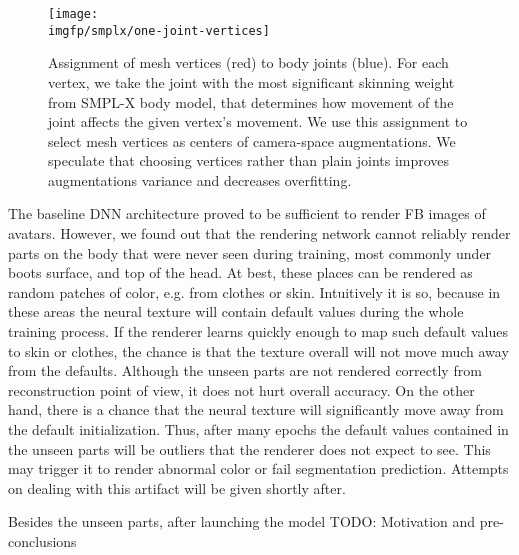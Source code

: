\begin{figure}
	\centering
		\texttt{[image: \\imgfp/smplx/one-joint-vertices]}%
	\caption{Assignment of mesh vertices (red) to body joints (blue). For each vertex, we take the joint with the most significant skinning weight from SMPL-X body model, that determines how movement of the joint affects the given vertex's movement. We use this assignment to select mesh vertices as centers of camera-space augmentations. We speculate that choosing vertices rather than plain joints improves augmentations variance and decreases overfitting.}
	\label{fig:smplx-vert2joint}
\end{figure}

The baseline DNN architecture \cite{dnn:stylepeople21} proved to be sufficient to render FB images of avatars. However, we found out that the rendering network cannot reliably render parts on the body that were never seen during training, most commonly under boots surface, and top of the head. At best, these places can be rendered as random patches of color, e.g. from clothes or skin. Intuitively it is so, because in these areas the neural texture will contain default values during the whole training process. If the renderer learns quickly enough to map such default values to skin or clothes, the chance is that the texture overall will not move much away from the defaults. Although the unseen parts are not rendered correctly from reconstruction point of view, it does not hurt overall accuracy. On the other hand, there is a chance that the neural texture will significantly move away from the default initialization. Thus, after many epochs the default values contained in the unseen parts will be outliers that the renderer does not expect to see. This may trigger it to render abnormal color or fail segmentation prediction. Attempts on dealing with this artifact will be given shortly after.

Besides the unseen parts, after launching the model
\alert{TODO: Motivation and pre-conclusions}

